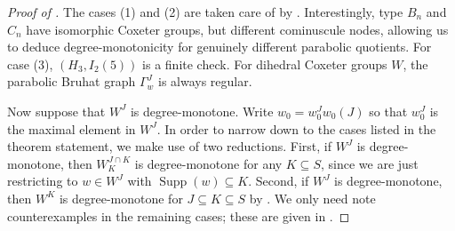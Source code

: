 \documentclass[11pt]{amsart}
\theoremstyle{definition}
\theoremstyle{remark}
\numberwithin{equation}{section}
\DeclareMathOperator{\supp}{Supp}
\begin{document}
\begin{proof}[Proof of ]
The cases (1) and (2) are taken care of by . Interestingly, type $B_n$ and $C_n$ have isomorphic Coxeter groups, but different cominuscule nodes, allowing us to deduce degree-monotonicity for genuinely different parabolic quotients. For case (3), $(H_3,I_2(5))$ is a finite check. For dihedral Coxeter groups $W$, the parabolic Bruhat graph $\Gamma^J_w$ is always regular. 

Now suppose that $W^J$ is degree-monotone. Write $w_0=w_0^J w_0(J)$ so that $w_0^J$ is the maximal element in $W^J$. In order to narrow down to the cases listed in the theorem statement, we make use of two reductions. First, if $W^J$ is degree-monotone, then $W_K^{J\cap K}$ is degree-monotone for any $K\subseteq S$, since we are just restricting to $w \in W^J$ with $\supp(w) \subseteq K$. Second, if $W^J$ is degree-monotone, then $W^K$ is degree-monotone for $J\subseteq K\subseteq S$ by . We only need note counterexamples in the remaining cases; these are given in . 


\end{proof}
\end{document}

